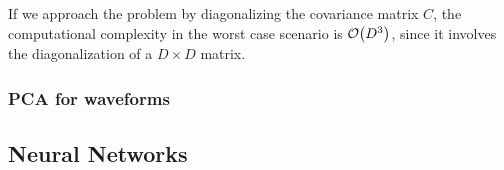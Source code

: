 \documentclass[main.tex]{subfiles}
\begin{document}
If we approach the problem by diagonalizing the covariance matrix \(C\), the computational complexity in the worst case scenario is \(\order{D^3}\), since it involves the diagonalization of a \(D \times D\) matrix.

\subsubsection{\ac{PCA} for waveforms}



\subsection{Neural Networks} \label{sec:neural-network}
\end{document}
